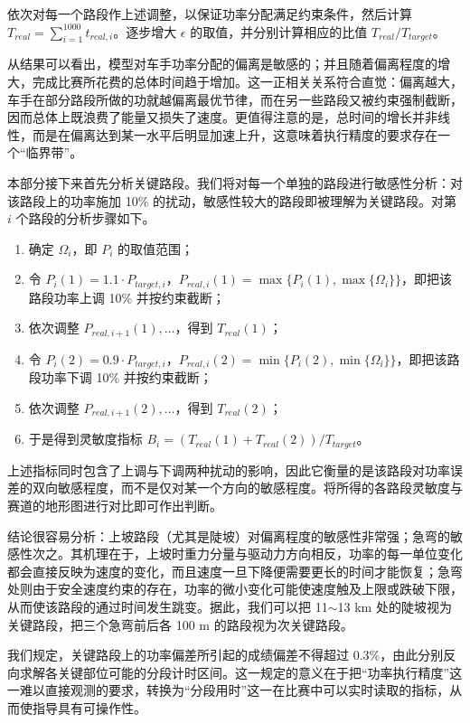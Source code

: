 \documentclass[11pt,a4paper]{ctexart}
\begin{document}
依次对每一个路段作上述调整，以保证功率分配满足约束条件，然后计算 $T_{real}=\sum_{i=1}^{1000}t_{real,i}$。逐步增大 $\epsilon$ 的取值，并分别计算相应的比值 $T_{real}/T_{target}$。

从结果可以看出，模型对车手功率分配的偏离是敏感的；并且随着偏离程度的增大，完成比赛所花费的总体时间趋于增加。这一正相关关系符合直觉：偏离越大，车手在部分路段所做的功就越偏离最优节律，而在另一些路段又被约束强制截断，因而总体上既浪费了能量又损失了速度。更值得注意的是，总时间的增长并非线性，而是在偏离达到某一水平后明显加速上升，这意味着执行精度的要求存在一个“临界带”。

本部分接下来首先分析关键路段。我们将对每一个单独的路段进行敏感性分析：对该路段上的功率施加 10\% 的扰动，敏感性较大的路段即被理解为关键路段。对第 $i$ 个路段的分析步骤如下。

\begin{enumerate}
\item 确定 $\Omega_i$，即 $P_i$ 的取值范围；
\item 令 $P_i(1)=1.1\cdot P_{target,i}$，$P_{real,i}(1)=\max\{P_i(1),\max\{\Omega_i\}\}$，即把该路段功率上调 10\% 并按约束截断；
\item 依次调整 $P_{real,i+1}(1),\ldots$，得到 $T_{real}(1)$；
\item 令 $P_i(2)=0.9\cdot P_{target,i}$，$P_{real,i}(2)=\min\{P_i(2),\min\{\Omega_i\}\}$，即把该路段功率下调 10\% 并按约束截断；
\item 依次调整 $P_{real,i+1}(2),\ldots$，得到 $T_{real}(2)$；
\item 于是得到灵敏度指标 $B_i=(T_{real}(1)+T_{real}(2))/T_{target}$。
\end{enumerate}

上述指标同时包含了上调与下调两种扰动的影响，因此它衡量的是该路段对功率误差的双向敏感程度，而不是仅对某一个方向的敏感程度。将所得的各路段灵敏度与赛道的地形图进行对比即可作出判断。

结论很容易分析：上坡路段（尤其是陡坡）对偏离程度的敏感性非常强；急弯的敏感性次之。其机理在于，上坡时重力分量与驱动力方向相反，功率的每一单位变化都会直接反映为速度的变化，而且速度一旦下降便需要更长的时间才能恢复；急弯处则由于安全速度约束的存在，功率的微小变化可能使速度触及上限或跌破下限，从而使该路段的通过时间发生跳变。据此，我们可以把 11$\sim$13 km 处的陡坡视为关键路段，把三个急弯前后各 100 m 的路段视为次关键路段。

我们规定，关键路段上的功率偏差所引起的成绩偏差不得超过 0.3\%，由此分别反向求解各关键部位可能的分段计时区间。这一规定的意义在于把“功率执行精度”这一难以直接观测的要求，转换为“分段用时”这一在比赛中可以实时读取的指标，从而使指导具有可操作性。
\end{document}

